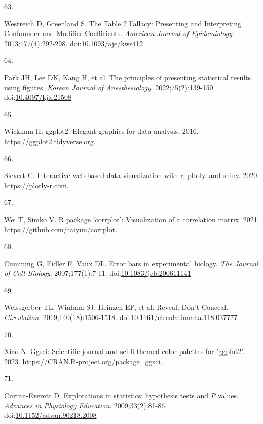 \documentclass[
]{book}
\newlength{\cslhangindent}
\newlength{\csllabelwidth}
\newlength{\cslentryspacingunit} %
\newenvironment{CSLReferences}[2] %
 {%
  \setlength{\parindent}{0pt}
  \ifodd #1
  \let\oldpar\par
  \def\par{\hangindent=\cslhangindent\oldpar}
  \fi
  \setlength{\parskip}{#2\cslentryspacingunit}
 }%
 {}
\newcommand{\CSLLeftMargin}[1]{\parbox[t]{\csllabelwidth}{#1}}
\newcommand{\CSLRightInline}[1]{\parbox[t]{\linewidth - \csllabelwidth}{#1}\break}
\begin{document}
\begin{CSLReferences}{0}{0}
\leavevmode{}%
\CSLLeftMargin{63. }%
\CSLRightInline{Westreich D, Greenland S. The Table 2 Fallacy: Presenting and Interpreting Confounder and Modifier Coefficients. \emph{American Journal of Epidemiology}. 2013;177(4):292-298. doi:\href{https://doi.org/10.1093/aje/kws412}{10.1093/aje/kws412}}

\leavevmode{}%
\CSLLeftMargin{64. }%
\CSLRightInline{Park JH, Lee DK, Kang H, et al. The principles of presenting statistical results using figures. \emph{Korean Journal of Anesthesiology}. 2022;75(2):139-150. doi:\href{https://doi.org/10.4097/kja.21508}{10.4097/kja.21508}}

\leavevmode{}%
\CSLLeftMargin{65. }%
\CSLRightInline{Wickham H. ggplot2: Elegant graphics for data analysis. 2016. \href{https://ggplot2.tidyverse.org}{https://ggplot2.tidyverse.org.}}

\leavevmode{}%
\CSLLeftMargin{66. }%
\CSLRightInline{Sievert C. Interactive web-based data visualization with r, plotly, and shiny. 2020. \href{https://plotly-r.com}{https://plotly-r.com.}}

\leavevmode{}%
\CSLLeftMargin{67. }%
\CSLRightInline{Wei T, Simko V. R package 'corrplot': Visualization of a correlation matrix. 2021. \href{https://github.com/taiyun/corrplot}{https://github.com/taiyun/corrplot.}}

\leavevmode{}%
\CSLLeftMargin{68. }%
\CSLRightInline{Cumming G, Fidler F, Vaux DL. Error bars in experimental biology. \emph{The Journal of Cell Biology}. 2007;177(1):7-11. doi:\href{https://doi.org/10.1083/jcb.200611141}{10.1083/jcb.200611141}}

\leavevmode{}%
\CSLLeftMargin{69. }%
\CSLRightInline{Weissgerber TL, Winham SJ, Heinzen EP, et al. Reveal, Don{'}t Conceal. \emph{Circulation}. 2019;140(18):1506-1518. doi:\href{https://doi.org/10.1161/circulationaha.118.037777}{10.1161/circulationaha.118.037777}}

\leavevmode{}%
\CSLLeftMargin{70. }%
\CSLRightInline{Xiao N. Ggsci: Scientific journal and sci-fi themed color palettes for 'ggplot2'. 2023. \href{https://CRAN.R-project.org/package=ggsci}{https://CRAN.R-project.org/package=ggsci.}}

\leavevmode{}%
\CSLLeftMargin{71. }%
\CSLRightInline{Curran-Everett D. Explorations in statistics: hypothesis tests and {\emph{P}} values. \emph{Advances in Physiology Education}. 2009;33(2):81-86. doi:\href{https://doi.org/10.1152/advan.90218.2008}{10.1152/advan.90218.2008}}


\end{CSLReferences}
\end{document}

